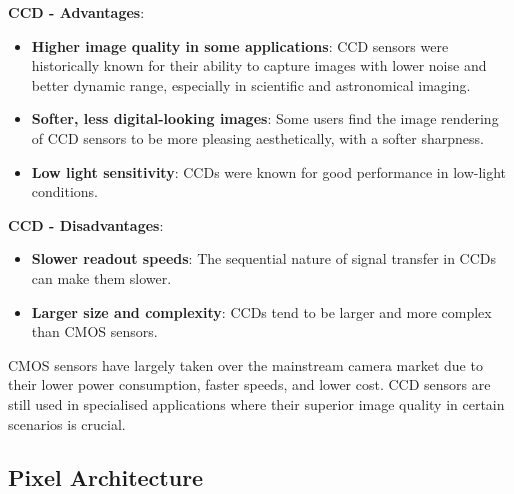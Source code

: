 \textbf{CCD - Advantages}:
\begin{itemize}
    \item \textbf{Higher image quality in some applications}: CCD sensors were historically known for their ability to capture images with lower noise and better dynamic range, especially in scientific and astronomical imaging.
    \item \textbf{Softer, less digital-looking images}: Some users find the image rendering of CCD sensors to be more pleasing aesthetically, with a softer sharpness.
    \item \textbf{Low light sensitivity}: CCDs were known for good performance in low-light conditions.
\end{itemize}
\textbf{CCD - Disadvantages}:
\begin{itemize}
    \item \textbf{Slower readout speeds}: The sequential nature of signal transfer in CCDs can make them slower.
    \item \textbf{Larger size and complexity}: CCDs tend to be larger and more complex than CMOS sensors.
\end{itemize}
CMOS sensors have largely taken over the mainstream camera market due to their lower power consumption, faster speeds, and lower cost. CCD sensors are still used in specialised applications where their superior image quality in certain scenarios is crucial. 

\subsection{Pixel Architecture}
